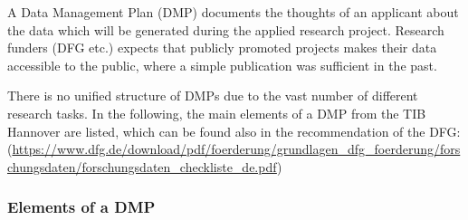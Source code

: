 A Data Management Plan (DMP) documents the thoughts of an applicant about the
data which will be generated during the applied research project. Research
funders (DFG etc.) expects that publicly promoted projects makes their data
accessible to the public, where a simple publication was sufficient in the past.

There is no unified structure of DMPs due to the vast number of different
research tasks. In the following, the main elements of a DMP from the
TIB Hannover are listed, which can be found also in the recommendation of the
DFG: \\
(\url{https://www.dfg.de/download/pdf/foerderung/grundlagen_dfg_foerderung/forschungsdaten/forschungsdaten_checkliste_de.pdf})

\subsubsection{Elements of a DMP}

